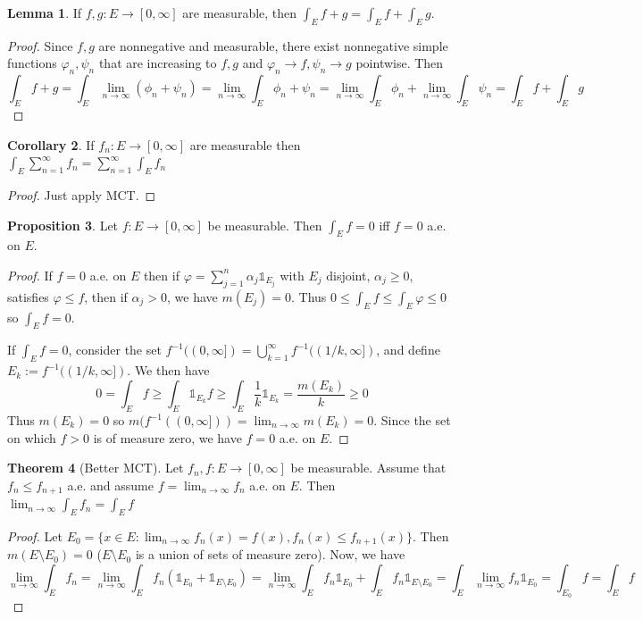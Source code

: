 \documentclass{article}
\theoremstyle{definition} %
\newtheorem{thm}{Theorem}
\numberwithin{thm}{section} %
\newtheorem{lemma}[thm]{Lemma}
\newtheorem{prop}[thm]{Proposition}
\newtheorem{cor}[thm]{Corollary}
\theoremstyle{definition} %
\begin{document}
\begin{lemma}
If $f, g: E \to [0, \infty]$ are measurable, then $\int_E f + g = \int_E f + \int_E g$.
\end{lemma}
\begin{proof}
Since $f, g$ are nonnegative and measurable, there exist nonnegative simple functions $\varphi_n, \psi_n$ that are increasing to $f, g$ and $\varphi_n \to f, \psi_n \to g$ pointwise. Then 
\[ \int_E f + g = \int_E \lim_{n \to \infty} (\phi_n + \psi_n) = \lim_{n \to \infty} \int_E \phi_n + \psi_n = \lim_{n \to \infty} \int_E \phi_n + \lim_{n \to \infty} \int_E \psi_n = \int_E f + \int_E g \]
\end{proof}

\begin{cor}
If $f_n: E \to [0, \infty]$ are measurable then $\int_E \sum_{n = 1}^\infty f_n = \sum_{n = 1}^\infty \int_E f_n$
\end{cor}
\begin{proof}
Just apply MCT.
\end{proof}

\begin{prop}
Let $f: E \to [0, \infty]$ be measurable. Then $\int_E f = 0$ iff $f = 0$ a.e. on $E$.
\end{prop}
\begin{proof}
If $f = 0$ a.e. on $E$ then if $\varphi = \sum_{j = 1}^n \alpha_j \mathds{1}_{E_j}$ with $E_j$ disjoint, $\alpha_j \geq 0$, satisfies $\varphi \leq f$, then if $\alpha_j > 0$, we have $m(E_j) = 0$. Thus $0 \leq \int_E f \leq \int_E \varphi \leq 0$ so $\int_E f = 0$.

If $\int_E f = 0$, consider the set $f^{-1}((0, \infty]) = \bigcup_{k = 1}^\infty f^{-1}((1/k, \infty])$, and define $E_k := f^{-1}((1/k, \infty])$. We then have 
\[ 0 = \int_E f \geq \int_E \mathds{1}_{E_k} f \geq \int_E \frac{1}{k}\mathds{1}_{E_k} = \frac{m(E_k)}{k} \geq 0 \]
Thus $m(E_k) = 0$ so $m(f^{-1}((0, \infty])) = \lim_{n \to \infty} m(E_k) = 0$. Since the set on which $f > 0$ is of measure zero, we have $f = 0$ a.e. on $E$.
\end{proof}

\begin{thm}[Better MCT]
Let $f_n, f: E \to [0, \infty]$ be measurable. Assume that $f_n \leq f_{n + 1}$ a.e. and assume $f = \lim_{n \to \infty} f_n$ a.e. on $E$. Then $\lim_{n \to \infty} \int_E f_n = \int_E f$
\end{thm}
\begin{proof}
Let $E_0 = \{x \in E: \lim_{n \to \infty} f_n(x) = f(x), f_n(x) \leq f_{n + 1}(x)\}$. Then $m(E \setminus E_0) = 0$ ($E \setminus E_0$ is a union of sets of measure zero). Now, we have 
\[ \lim_{n \to \infty} \int_E f_n = \lim_{n \to \infty} \int_E f_n (\mathds{1}_{E_0} + \mathds{1}_{E \setminus E_0}) = \lim_{n \to \infty} \int_E f_n \mathds{1}_{E_0} + \int_E f_n \mathds{1}_{E \setminus E_0} = \int_E \lim_{n \to \infty} f_n \mathds{1}_{E_0} = \int_{E_0} f = \int_E f \]
\end{proof}
\end{document}
